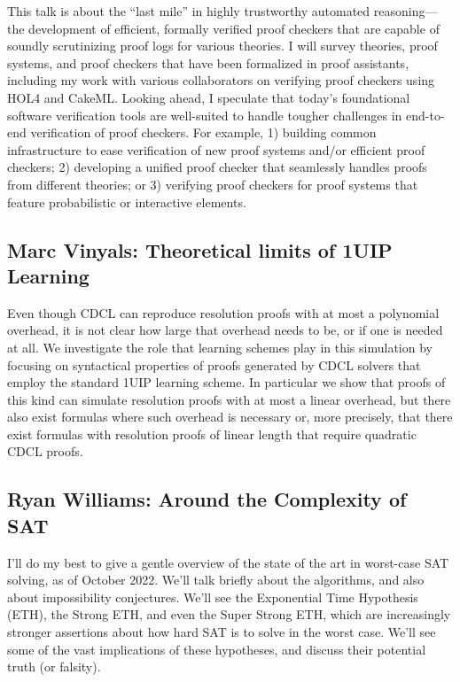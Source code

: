 \documentclass[11pt]{article}
\begin{document}
This talk is about the ``last mile'' in highly trustworthy automated reasoning---the development of efficient, formally verified proof checkers that are capable of soundly scrutinizing proof logs for various theories. I will survey theories, proof systems, and proof checkers that have been formalized in proof assistants, including my work with various collaborators on verifying proof checkers using HOL4 and CakeML. Looking ahead, I speculate that today's foundational software verification tools are well-suited to handle tougher challenges in end-to-end verification of proof checkers. For example, 1) building common infrastructure to ease verification of new proof systems and/or efficient proof checkers; 2) developing a unified proof checker that seamlessly handles proofs from different theories; or 3) verifying proof checkers for proof systems that feature probabilistic or interactive elements.


\subsection*{Marc Vinyals: Theoretical limits of 1UIP Learning}\label{Vinyals}

Even though CDCL can reproduce resolution proofs with at most a polynomial overhead, it is not clear how large that overhead needs to be, or if one is needed at all. We investigate the role that learning schemes play in this simulation by focusing on syntactical properties of proofs generated by CDCL solvers that employ the standard 1UIP learning scheme. In particular we show that proofs of this kind can simulate resolution proofs with at most a linear overhead, but there also exist formulas where such overhead is necessary or, more precisely, that there exist formulas with resolution proofs of linear length that require quadratic CDCL proofs.


\subsection*{Ryan Williams: Around the Complexity of SAT}\label{Williams}

I'll do my best to give a gentle overview of the state of the art in worst-case SAT solving, as of October 2022. We'll talk briefly about the algorithms, and also about impossibility conjectures. We'll see the Exponential Time Hypothesis (ETH), the Strong ETH, and even the Super Strong ETH, which are increasingly stronger assertions about how hard SAT is to solve in the worst case. We'll see some of the vast implications of these hypotheses, and discuss their potential truth (or falsity).
\end{document}
